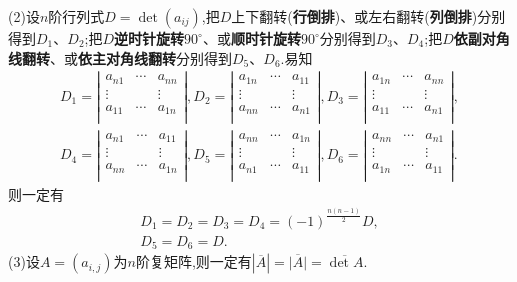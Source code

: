 \documentclass[../../main.tex]{subfiles}
\begin{document}
\begin{proposition}
(2)设$n$阶行列式$D=\det(a_{ij})$,把$D$上下翻转(\textbf{行倒排})、或左右翻转(\textbf{列倒排})分别得到$D_1$、$D_2$;把$D$\textbf{逆时针旋转$90^{\circ}$}、或\textbf{顺时针旋转$90^{\circ}$}分别得到$D_3$、$D_4$;把$D$\textbf{依副对角线翻转}、或\textbf{依主对角线翻转}分别得到$D_5$、$D_6$.易知
\begin{align*}
D_1=\left| \begin{matrix}
a_{n1}&		\cdots&		a_{nn}\\
\vdots&		&		\vdots\\
a_{11}&		\cdots&		a_{1n}\\
\end{matrix} \right|,D_2=\left| \begin{matrix}
a_{1n}&		\cdots&		a_{11}\\
\vdots&		&		\vdots\\
a_{nn}&		\cdots&		a_{n1}\\
\end{matrix} \right|,D_3=\left| \begin{matrix}
a_{1n}&		\cdots&		a_{nn}\\
\vdots&		&		\vdots\\
a_{11}&		\cdots&		a_{n1}\\
\end{matrix} \right|,
\\
D_4=\left| \begin{matrix}
a_{n1}&		\cdots&		a_{11}\\
\vdots&		&		\vdots\\
a_{nn}&		\cdots&		a_{1n}\\
\end{matrix} \right|,D_5=\left| \begin{matrix}
a_{nn}&		\cdots&		a_{1n}\\
\vdots&		&		\vdots\\
a_{n1}&		\cdots&		a_{11}\\
\end{matrix} \right|,D_6=\left| \begin{matrix}
a_{nn}&		\cdots&		a_{n1}\\
\vdots&		&		\vdots\\
a_{1n}&		\cdots&		a_{11}\\
\end{matrix} \right|.
\nonumber
\end{align*}
则一定有
\begin{gather*}
D_1=D_2=D_3=D_4=\left( -1 \right) ^{\frac{n\left( n-1 \right)}{2}}D,
\\
D_5=D_6=D.
\nonumber
\end{gather*}
(3)设\(A=(a_{i,j})\)为\(n\)阶复矩阵,则一定有\(\left| \overline{A} \right|=\overline{\left| A \right|}=\overline{\det A}\).


\end{proposition}
\end{document}
